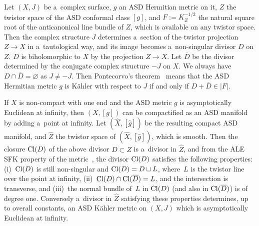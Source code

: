 Let $(X,J)$ be a~complex surface, $g$ an ASD Hermitian metric on it, $Z$ the twistor space of the ASD conformal class
$[g]$, and $F:=K_Z^{-1/2}$ the natural square root of the anticanonical line bundle of $Z$, which is available on any
twistor space.
Then the complex structure $J$ determines a~section of the twistor projection $Z\to X$ in a~tautological way, and its
image becomes a~non-singular divisor $D$ on $Z$.
$D$ is biholomorphic to $X$ by the projection $Z\to X$.
Let $\overline D$ be the divisor determined by the conjugate complex structure $-J$ on $X$.
We always have $D\cap \overline D=\varnothing$ as $J\neq -J$.
Then Pontecorvo's theorem~\cite{Pont92} means that the ASD Hermitian metric $g$ is K\"ahler with respect to $J$ if and
only if $D + \overline D\in |F|$.

If $X$ is non-compact with one end and the ASD metric $g$ is asymptotically Euclidean at inf\/inity, then $(X,[g])$ can
be compactif\/ied as an ASD manifold by adding a~point at inf\/inity.
Let $(\hat X,[\hat g])$ be the resulting compact ASD manifold, and $\hat Z$ the twistor space of $(\hat X, [\hat g])$,
which is smooth.
Then the closure ${\rm{Cl}}(D)$ of the above divisor $D\subset Z$ is a~divisor in $\hat Z$, and from the ALE SFK
property of the metric~\cite[proof of Proposition~6, p.~312]{LB92}, the divisor ${\rm{Cl}}(D)$ satisf\/ies the following
properties: (i)~${\rm{Cl}}(D)$ is still non-singular and ${\rm{Cl}}(D) = D\sqcup L$, where~$L$ is the twistor line over
the point at inf\/inity, (ii)~${\rm{Cl}}(D)\cap {\rm{Cl}}(\overline D)=L$, and the intersection is transverse, and (iii)~the normal bundle of~$L$ in ${\rm{Cl}}(D)$ (and also in ${\rm{Cl}}(\overline D)$) is of degree one.
Conversely a~divisor in $\hat Z$ satisfying these properties determines, up to overall constants, an ASD K\"ahler metric
on $(X,J)$ which is asymptotically Euclidean at inf\/inity.


